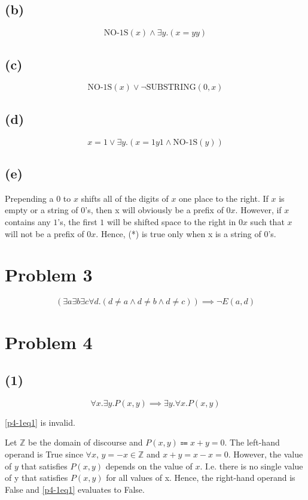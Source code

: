 \documentclass{article}
\begin{document}
\subsection{(b)}
\[
	\text{NO-1S}(x) \land  \exists y.(x = yy)
\]

\subsection{(c)}
\[
	\text{NO-1S}(x) \lor \neg \text{SUBSTRING}(0, x)
\]

\subsection{(d)}
\[
	x = 1 \lor \exists y.(x = 1y1 \land \text{NO-1S}(y))
\]

\subsection{(e)}
Prepending a $0$ to $x$ shifts all of the digits of $x$ one place to the right. If $x$ is empty or a string of $0$'s, then x will obviously be a prefix of $0x$. However, if $x$ contains any $1$'s, the first $1$ will be shifted space to the right in $0x$ such that $x$ will not be a prefix of $0x$. Hence, (*) is true only when x is a string of $0$'s.

\pagebreak

\section{Problem 3}
\[
	(\exists a \exists b \exists c \forall d .(d \ne a \land d \ne b \land d \ne c)) \implies \neg E(a, d)
\]

\pagebreak

\section{Problem 4}

\subsection{(1)}
\begin{equation}\label{p4-1eq1}
	\forall x. \exists y.P(x, y) \implies \exists y. \forall x.P(x, y)
\end{equation}

\eqref{p4-1eq1} is invalid.

Let $\mathbb{Z}$ be the domain of discourse and $P(x, y) \Coloneqq x + y = 0$. The left-hand operand is True since $\forall x$, $y = -x \in \mathbb{Z}$ and $x + y = x - x = 0$. However, the value of $y$ that satisfies $P(x, y)$ depends on the value of $x$. I.e. there is no single value of y that satisfies $P(x, y)$ for all values of x. Hence, the right-hand operand is False and \eqref{p4-1eq1} evaluates to False.
\end{document}
